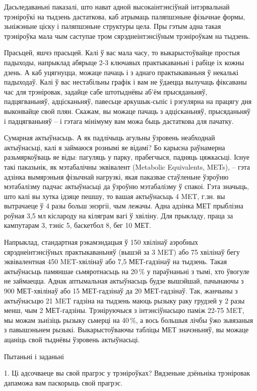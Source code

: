 Дасьледаваньні паказалі, што нават адной высокаінтэнсіўнай інтэрвальнай трэніроўкі на тыдзень дастаткова, каб атрымаць паляпшэньне фізычнае формы, зьніжэньне ціску і паляпшэньне структуры цела. Пры гэтым адна такая трэніроўка мала чым саступае тром сярэднеінтэнсіўным трэніроўкам на тыдзень.

Прасьцей, яшчэ прасьцей. Калі ў вас мала часу, то выкарыстоўвайце простыя падыходы, напрыклад абярыце 2-3 ключавых практыкаваньні і рабіце іх кожны дзень. А каб уцягнуцца, можаце пачаць і з аднаго практыкаваньня ў некалькі падыходаў. Калі ў вас нестабільны графік і вам не ўдаецца вылучаць фіксаваны час для трэніровак, задайце сабе штотыднёвы аб'ём прысяданьняў, падцягваньняў, адцісканьняў, павесьце аркушык-сьпіс і рэгулярна на працягу дня выконвайце свой плян. Скажам, вы можаце пачаць з адцісканьняў, прысяданьняў і падцягваньняў – і гэтага мінімуму вам можа быць дастаткова для пачатку.

Сумарная актыўнасьць. А як падлічыць агульны ўзровень неабходнай актыўнасьці, калі я займаюся рознымі яе відамі? Бо карысна раўнамерна разьмяркоўваць яе віды: пагуляць у парку, прабегчыся, падняць цяжкасьці. Існуе такі паказьнік, як мэтабалічны эквівалент (Metabolic Equivalents, METs), – гэта адзінка вымярэньня фізычнай нагрузкі, якая паказвае стаўленьне ўзроўню мэтабалізму падчас актыўнасьці да ўзроўню мэтабалізму ў спакоі. Гэта значыць, што калі вы хутка ідзяце пешшу, то вашая актыўнасьць 4 MET, г.зн. вы вытрачаеце ў 4 разы больш энэргіі, чым лежачы. Адна адзінка МЕТ прыблізна роўная 3,5 мл кіслароду на кіляграм вагі ў хвіліну. Для прыкладу, праца за кампутарам 3, тэніс 5, баскетбол 8, бег 10 МЕТ.

Напрыклад, стандартная рэкамэндацыя ў 150 хвілінаў аэробных сярэднеінтэнсіўных практыкаваньняў (вышэй за 3 MET) або 75 хвілінаў бегу эквівалентная 450 MET-хвілінаў або 7,5 МЕТ-гадзінаў на тыдзень. Такая актыўнасьць памяншае сьмяротнасьць на 20\,\% у параўнаньні з тымі, хто ўвогуле не займаецца. Аднак аптымальная актыўнасьць будзе вышэйшай, пачынаючы з 900 МЕТ-хвілінаў або 15 МЕТ-гадзінаў да 20 МЕТ-гадзінаў. Так, жанчыны з актыўнасьцю 21 MET гадзіна на тыдзень маюць рызыку раку грудзей у 2 разы менш, чым 2 МЕТ-гадзіны. Трэніруючыся з інтэнсіўнасьцю паміж 22-75 MET, мы можам зьнізіць рызыку сьмерці на 40\,\%, а вось большыя лічбы ўжо зьвязаныя з павышэньнем рызыкі. Выкарыстоўваючы табліцы МЕТ значэньняў, вы можаце ацаніць свой тыднёвы ўзровень актыўнасьці.

Пытаньні і заданьні

1. Ці адсочваеце вы свой прагрэс у трэніроўках? Вядзеньне дзёньніка трэніровак дапаможа вам паскорыць свой прагрэс.

